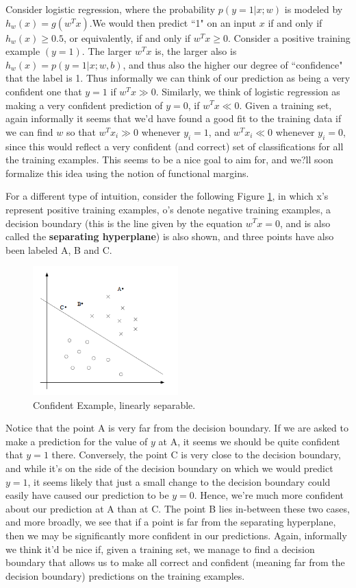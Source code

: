 \documentclass[a4paper]{article}
\begin{document}
Consider logistic regression, where the probability $p(y = 1 | x; w)$ is modeled by $h_w(x) = g(w^T x)$.We would then predict ``1" on an input $x$ if and only if $h_w(x) \geq 0.5$, or equivalently, if and only if $w^T x \geq 0$. Consider a positive training example $(y = 1)$. The larger $w^T x$ is, the larger also is $h_w(x) = p(y=1 | x; w, b)$, and thus also the higher our degree of ``confidence" that the label is 1. Thus informally we can think of our prediction as being a very confident one that $y = 1$ if $w^T x \gg 0$. Similarly, we think of logistic regression as making a very confident prediction of $y = 0$, if $w^T x \ll 0$. Given a training set, again informally it seems that we'd have found a good fit to the training data if we can find $w$ so that $w^Tx_i \gg 0$ whenever $y_i = 1$, and $w^T x_i \ll 0$ whenever $y_i = 0$, since this would reflect a very confident (and correct) set of classifications for all the training examples. This seems to be a nice goal to aim for, and we?ll soon formalize this idea using the notion of functional margins. 

For a different type of intuition, consider the following Figure \ref{fig:confident}, in which x's represent positive training examples, o's denote negative training examples, a decision boundary (this is the line given by the equation $w^Tx  = 0$, and is also called the \textbf{separating hyperplane}) is also shown, and three points have also been labeled A, B and C.
\begin{figure}[h!]
  \centering
    \includegraphics[width=0.5\textwidth]{./images/confident}
  \caption{Confident Example, linearly separable.}\label{fig:confident}
\end{figure}

Notice that the point A is very far from the decision boundary. If we are asked to make a prediction for the value of $y$ at A, it seems we should be quite confident that $y=1$ there. Conversely, the point C is very close to the decision boundary, and while it's on the side of the decision boundary on which we would predict $y = 1$, it seems likely that just a small change to the decision boundary could easily have caused our prediction to be $y = 0$. Hence, we're much more confident about our prediction at A than at C. The point B lies in-between these two cases, and more broadly, we see that if a point is far from the separating hyperplane, then we may be significantly more confident in our predictions. Again, informally we think it'd be nice if, given a training set, we manage to find a decision boundary that allows us to make all correct and confident (meaning far from the decision boundary) predictions on the training examples. 
\end{document}
